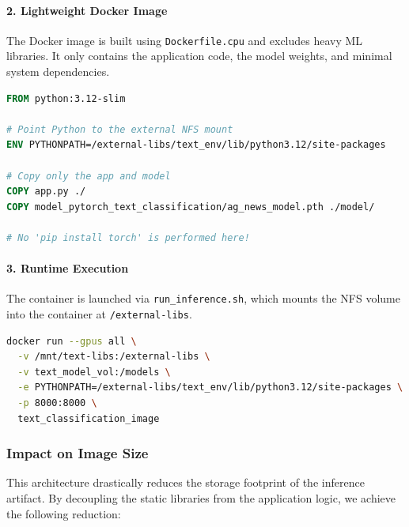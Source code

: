 \documentclass[10pt,a4paper,twocolumn]{article}
\begin{document}
\paragraph{2. Lightweight Docker Image}
The Docker image is built using \texttt{Dockerfile.cpu} and excludes heavy ML libraries. It only contains the application code, the model weights, and minimal system dependencies.

\begin{lstlisting}[language=Dockerfile, caption={Dockerfile.cpu Configuration}]
FROM python:3.12-slim

# Point Python to the external NFS mount
ENV PYTHONPATH=/external-libs/text_env/lib/python3.12/site-packages

# Copy only the app and model
COPY app.py ./
COPY model_pytorch_text_classification/ag_news_model.pth ./model/

# No 'pip install torch' is performed here!
\end{lstlisting}

\paragraph{3. Runtime Execution}
The container is launched via \texttt{run\_inference.sh}, which mounts the NFS volume into the container at \texttt{/external-libs}.

\begin{lstlisting}[language=bash, caption={Mounting the NFS Library Volume}]
docker run --gpus all \
  -v /mnt/text-libs:/external-libs \
  -v text_model_vol:/models \
  -e PYTHONPATH=/external-libs/text_env/lib/python3.12/site-packages \
  -p 8000:8000 \
  text_classification_image
\end{lstlisting}

\subsubsection{Impact on Image Size}

This architecture drastically reduces the storage footprint of the inference artifact. By decoupling the static libraries from the application logic, we achieve the following reduction:

\end{document}
